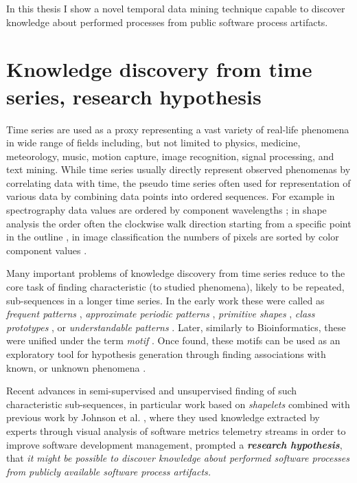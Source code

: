 In this thesis I show a novel temporal data mining technique capable to discover knowledge about performed processes
from public software process artifacts.

\section{Knowledge discovery from time series, research hypothesis}\label{knowledge_discovery}
Time series are used as a proxy representing a vast variety of real-life phenomena 
in wide range of fields including, but not limited to physics, medicine, meteorology, 
music, motion capture, image recognition, signal processing, and text mining. 
While time series usually directly represent observed phenomenas by correlating data with time, the pseudo 
time series often used for representation of various data by combining data points into ordered sequences. 
For example in spectrography data values are ordered by component wavelengths \cite{citeulike:12550833};
in shape analysis the order often the clockwise walk direction starting from a
specific point in the outline \cite{citeulike:12550835}, in image classification the numbers of pixels
are sorted by color component values \cite{citeulike:2900542}.

Many important problems of knowledge discovery from time series reduce to the core task of finding 
characteristic (to studied phenomena), likely to be repeated, sub-sequences in a longer time series. 
In the early work these were called as 
\textit{frequent patterns} \cite{citeulike:5159615}, 
\textit{approximate periodic patterns} \cite{citeulike:1959582},
\textit{primitive shapes} \cite{citeulike:5898869}, 
\textit{class prototypes} \cite{citeulike:4406444}, 
or \textit{understandable patterns} \cite{citeulike:3978076}. 
Later, similarly to Bioinformatics, these were unified under the term \textit{motif} \cite{citeulike:3977965}.
Once found, these motifs can be used as an exploratory tool for hypothesis generation through finding 
associations with known, or unknown phenomena \cite{citeulike:3977965}.

Recent advances in semi-supervised and unsupervised finding of such characteristic sub-sequences, 
in particular work based on \textit{shapelets} \cite{citeulike:7344347} \cite{citeulike:11957982}
\cite{citeulike:12552293} combined with previous work by Johnson et al. \cite{citeulike:12550871}, 
where they used knowledge extracted by experts through visual analysis of software metrics 
telemetry streams in order to improve software development management, 
prompted a \textbf{\textit{research hypothesis}}, that \textit{it might be possible to discover 
knowledge about performed software processes from publicly available software process artifacts.}

